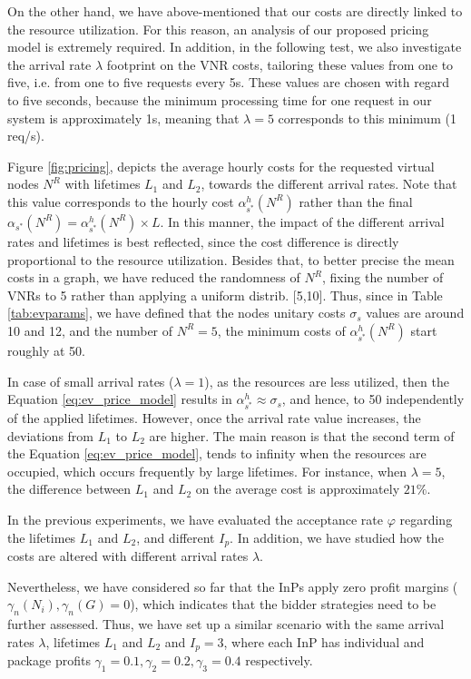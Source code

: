On the other hand, we have above-mentioned that our costs are directly linked to the resource utilization. For this reason, an analysis of our proposed pricing model is extremely required. In addition, in the following test, we also investigate the arrival rate $\lambda$ footprint on the VNR costs, tailoring these values from one to five, i.e. from one to five requests every 5s. These values are chosen with regard to five seconds, because the minimum processing time for one request in our system is approximately 1s, meaning that $\lambda = 5$ corresponds to this minimum (1 req/s).

Figure \ref{fig:pricing}, depicts the average hourly costs for the requested virtual nodes $N^R$ with lifetimes $L_1$ and $L_2$, towards the different arrival rates. Note that this value corresponds to the hourly cost $\alpha^{h}_{s^{*}}(N^R)$ rather than the final $ \alpha_{s^{*}}(N^R) = \alpha^{h}_{s^{*}}(N^R) \times L$. In this manner, the impact of the different arrival rates and lifetimes is best reflected, since the cost difference is directly proportional to the resource utilization. Besides that, to better precise the mean costs in a graph, we have reduced the randomness of $N^R$, fixing the number of VNRs to 5 rather than applying a uniform distrib. [5,10]. Thus, since in Table \ref{tab:evparams}, we have defined that the nodes unitary costs $\sigma_s$ values are around 10 and 12, and the number of $N^R = 5$, the minimum costs of $\alpha^{h}_{s^{*}}(N^R)$ start roughly at 50.

In case of small arrival rates ($\lambda = 1$), as the resources are less utilized, then the Equation \ref{eq:ev_price_model} results in $\alpha^{h}_{s^{*}} \approx \sigma_s$, and hence, to 50 independently of the applied lifetimes. However, once the arrival rate value increases, the deviations from $L_1$ to $L_2$ are higher. The main reason is that the second term of the Equation \ref{eq:ev_price_model}, tends to infinity when the resources are occupied, which occurs frequently by large lifetimes. For instance, when $\lambda = 5$, the difference between $L_1$ and $L_2$ on the average cost is approximately $21\%$.

In the previous experiments, we have evaluated the acceptance rate $\varphi$ regarding the lifetimes $L_1$ and $L_2$, and different $I_p$. In addition, we have studied how the costs are altered with different arrival rates $\lambda$. 

Nevertheless, we have considered so far that the InPs apply zero profit margins ($\gamma_n(N_i), \gamma_n(G) = 0$), which indicates that the bidder strategies need to be further assessed. Thus, we have set up a similar scenario with the same arrival rates $\lambda$, lifetimes $L_1$ and $L_2$ and $I_p = 3$, where each InP has individual and package profits $\gamma_1 = 0.1, \gamma_2 = 0.2, \gamma_3 = 0.4$ respectively. 

